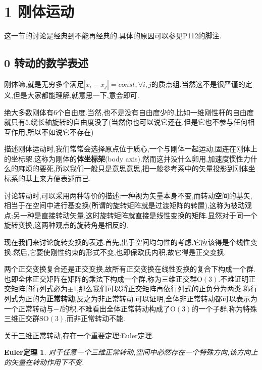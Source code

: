 \documentclass[UTF8]{article}
\begin{document}
	
	
	
	
	
	
\section*{1 刚体运动}
	
	这一节的讨论是经典到不能再经典的.具体的原因可以参见\cite{LiuChuan}P112的脚注.
	
\subsection*{0 转动的数学表述}
	
	刚体嘛,就是无穷多个满足$|x_i-x_j|=const,\forall i,j$的质点组.当然这不是很严谨的定义,但是大家都能理解,就意思一下,意会即可.
	
	绝大多数刚体有6个自由度.当然,也不是没有自由度少的,比如一维刚性杆的自由度就只有5,绕长轴旋转的自由度没了(当然你也可以说它还在,但是它也不参与任何相互作用,所以不如说它不存在)
	
	描述刚体运动时,我们常常会选择原点位于质心,一个与刚体一起运动,固连在刚体上的坐标架.这称为刚体的\textbf{体坐标架}(body axis).然而这并没什么卵用,加速度惯性力什么的麻烦的要死,所以我们一般只是意思意思,把一般参考系中的矢量投影到刚体坐标系的基上来方便表述而已.
	
	讨论转动时,可以采用两种等价的描述:一种视为矢量本身不变,而转动空间的基矢,相当于在空间中进行基变换(所谓的旋转矩阵就是过渡矩阵的转置),这称为被动观点;另一种是直接转动矢量,这时旋转矩阵就直接是线性变换的矩阵.显然对于同一个旋转变换,这两种观点的旋转角是相反的.
	
	现在我们来讨论旋转变换的表述.首先,出于空间均匀性的考虑,它应该得是个线性变换.然后,它要使刚性约束的形式不变,也即保欧氏内积,故它得是正交变换.
	
	两个正交变换复合还是正交变换,故所有正交变换在线性变换的复合下构成一个群.也即全体正交矩阵在矩阵的乘法下构成一个群,称为三维正交群$\mathrm{O(3)}$.不难证明正交矩阵的行列式必为$\pm1$,那么我们可以将正交矩阵再依行列式的正负分为两类.称行列式为正的为\textbf{正常转动},反之为非正常转动.可以证明,全体非正常转动都可以表示为一个正常转动与$-I$的积.不难看出全体正常转动构成了$\mathrm{O(3)}$的一个子群,称为特殊三维正交群$\mathrm{SO(3)}$,而非正常转动不能.
	
	关于三维正常转动,存在一个重要定理:Euler定理.
	
	\newtheorem*{Euler}{Euler定理}
	
	\begin{Euler}
		对于任意一个三维正常转动,空间中必然存在一个特殊方向,该方向上的矢量在转动作用下不变.
	\end{Euler}
	
\end{document}
